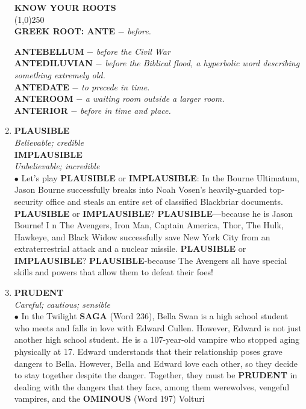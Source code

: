 \documentclass{book}
\begin{document}
\begin{enumerate}
\begin{tcolorbox}
\begin{center}
\textbf{ KNOW YOUR ROOTS}\\
\line(1,0){250}\\
\textbf{GREEK ROOT: ANTE }$ -$ \textit{before.}\\ 
\end{center}  
 
\textbf{ANTEBELLUM} $ -$ \textit{before the Civil War}\\ \textbf{ANTEDILUVIAN} $ -$ \textit{before the Biblical flood, a hyperbolic word describing something extremely old.}\\ \textbf{ANTEDATE} $ -$ \textit{to precede in time.}\\
\textbf{ANTEROOM} $ -$ \textit{a waiting room outside a larger room.}\\ 
\textbf{ANTERIOR} $ -$ \textit{before in time and place.}
\end{tcolorbox}

\item \textbf{PLAUSIBLE}\\ \textit{Believable; credible}\\ 
\textbf{IMPLAUSIBLE}\\
\textit{Unbelievable; incredible}\\ 

$\bullet$ Let's play \textbf{PLAUSIBLE} or \textbf{IMPLAUSIBLE}: In the Bourne Ultimatum, Jason Bourne successfully breaks into Noah Vosen's heavily-guarded top- security office and steals an entire set of classified Blackbriar documents. \textbf{PLAUSIBLE} or \textbf{IMPLAUSIBLE}? \textbf{PLAUSIBLE}—because he is Jason Bourne! I n The Avengers, Iron Man, Captain America, Thor, The Hulk, Hawkeye, and Black Widow successfully save New York City from an extraterrestrial attack and a nuclear missile. \textbf{PLAUSIBLE} or \textbf{IMPLAUSIBLE}? \textbf{PLAUSIBLE}-because The Avengers all have special skills and powers that allow them to defeat their foes!

\item \textbf{PRUDENT}\\
\textit{Careful; cautious; sensible}\\

$\bullet$ In the Twilight \textbf{SAGA} (Word 236), Bella Swan is a high school student who meets and falls in love with Edward Cullen. However, Edward is not just another high school student. He is a 107-year-old vampire who stopped aging physically at 17. Edward understands that their relationship poses grave dangers to Bella. However, Bella and Edward love each other, so they decide to stay together despite the danger. Together, they must be \textbf{PRUDENT} in dealing with the dangers that they face, among them werewolves, vengeful vampires, and the \textbf{OMINOUS} (Word 197) Volturi


\end{enumerate}
\end{document}
